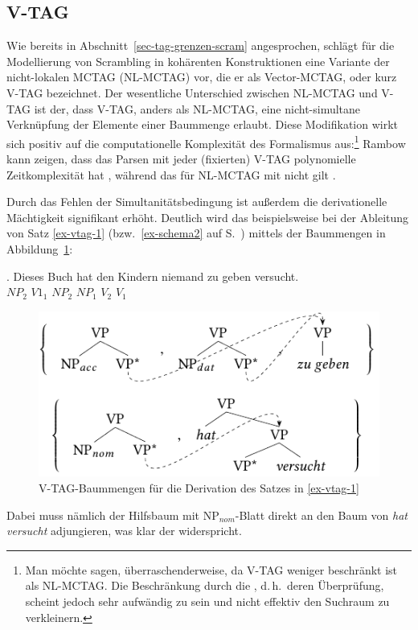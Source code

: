\subsection{V-TAG} \label{sec-tag-varianten-vtag}

Wie bereits in Abschnitt~\ref{sec-tag-grenzen-scram} angesprochen, schlägt \cite{Rambow:94} für die Modellierung von Scrambling in kohärenten Konstruktionen eine Variante der nicht-lokalen MCTAG (NL-MCTAG) vor, die er als Vector-MCTAG, oder kurz V-TAG bezeichnet. Der wesentliche Unterschied zwischen NL-MCTAG und V-TAG ist der, dass V-TAG, anders als NL-MCTAG, eine nicht-simultane Verknüpfung der Elemente einer Baummenge erlaubt. Diese Modifikation wirkt sich positiv auf die computationelle Komplexität des Formalismus aus:\footnote{Man möchte sagen, überraschenderweise, da V-TAG weniger beschränkt ist als NL-MCTAG. Die Beschränkung durch die , d.\,h.\ deren Überprüfung, scheint jedoch sehr aufwändig zu sein und nicht effektiv den Suchraum zu verkleinern.} Rambow kann zeigen, dass das Parsen mit jeder (fixierten) V-TAG polynomielle Zeitkomplexität hat \cite[120ff]{Rambow:94}, während das für NL-MCTAG mit  nicht gilt \citep{Rambow:Satta:92,Champollion:11a}. 

Durch das Fehlen der Simultanitätsbedingung ist au\ss erdem die derivationelle Mächtigkeit signifikant erhöht. Deutlich wird das beispielsweise bei der Ableitung von Satz \ref{ex-vtag-1} (bzw.\ \ref{ex-schema2} auf S.~\pageref{ex-schema2}) mittels der Baummengen in Abbildung~\ref{fig-vtag-1}:

\exg. {Dieses Buch} hat {den Kindern} niemand {zu geben} versucht.  \\
$\mathit{NP}_2$ $V1_1$ $\mathit{NP}_2$ $\mathit{NP}_1$ $V_2$ $V_1$ \\
\citep[42]{Rambow:94} \label{ex-vtag-1}

\begin{figure}[t]
\centering
\includegraphics{graphics/abb66.pdf}
\caption{V-TAG-Baummengen für die Derivation des Satzes in \ref{ex-vtag-1}\label{fig-vtag-1}}
\end{figure}
Dabei muss nämlich der Hilfsbaum mit NP$_{nom}$-Blatt direkt an den Baum von {\it hat versucht} adjungieren, was klar der  widerspricht.

